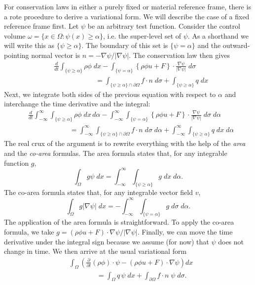 \documentclass{article}
\theoremstyle{definition}
\theoremstyle{plain}
\begin{document}
For conservation laws in either a purely fixed or material reference frame, there is a rote procedure to derive a variational form.
We will describe the case of a fixed reference frame first.
Let $\psi$ be an arbitrary test function.
Consider the control volume $\omega = \{x \in \Omega : \psi(x) \ge \alpha\}$, i.e. the super-level set of $\psi$.
As a shorthand we will write this as $\{\psi \ge \alpha\}$.
The boundary of this set is $\{\psi = \alpha\}$ and the outward-pointing normal vector is $n = -\nabla \psi/|\nabla \psi|$.
The conservation law then gives
\begin{align}
    & \frac{d}{dt}\int_{\{\psi \ge \alpha\}}\rho\phi\;dx - \int_{\{\psi = \alpha\}}\left\{\rho\phi u + F\right\}\cdot \frac{\nabla\psi}{|\nabla\psi|}\;d\sigma \nonumber\\
    & \qquad\qquad\qquad = \int_{\{\psi \ge \alpha\}\cap\partial\Omega}f\cdot n\;d\sigma + \int_{\{\psi \ge \alpha\}}q\;dx \label{eq:conservation-law-superlevel-set}
\end{align}
Next, we integrate both sides of the previous equation with respect to $\alpha$ and interchange the time derivative and the integral:
\begin{align}
    & \frac{d}{dt}\int_{-\infty}^\infty\int_{\{\psi \ge \alpha\}}\rho\phi\;dx\,d\alpha - \int_{-\infty}^\infty\int_{\{\psi = \alpha\}}\left\{\rho\phi u + F\right\}\cdot \frac{\nabla\psi}{|\nabla\psi|}\;d\sigma\;d\alpha \nonumber\\
    & \qquad\qquad\qquad = \int_{-\infty}^\infty\int_{\{\psi\ge\alpha\}\cap\partial\Omega}f\cdot n\;d\sigma\;d\alpha + \int_{-\infty}^\infty\int_{\{\psi \ge \alpha\}}q\;dx\;d\alpha
\end{align}
The real crux of the argument is to rewrite everything with the help of the \emph{area} and the \emph{co-area} formulas.
The area formula states that, for any integrable function $g$,
\begin{equation}
    \int_\Omega g\psi\;dx = \int_{-\infty}^\infty\int_{\{\psi\ge\alpha\}}g\;dx\;d\alpha.
\end{equation}
The co-area formula states that, for any integrable vector field $v$,
\begin{equation}
    \int_\Omega g|\nabla\psi|\;dx = -\int_{-\infty}^\infty\int_{\{\psi=\alpha\}}g\;d\sigma\;d\alpha.
\end{equation}
The application of the area formula is straightforward.
To apply the co-area formula, we take $g = (\rho\phi u + F)\cdot\nabla\psi / |\nabla\psi|$.
Finally, we can move the time derivative under the integral sign because we assume (for now) that $\psi$ does not change in time.
We then arrive at the usual variational form
\begin{align}
    & \int_\Omega\left(\frac{\partial}{\partial t}(\rho \phi)\cdot \psi - (\rho \phi u + F)\cdot\nabla\psi\right)dx \nonumber\\
    & \qquad\qquad = \int_\Omega q\,\psi\;dx + \int_{\partial\Omega}f\cdot n\;\psi\;d\sigma.
\end{align}
\end{document}
